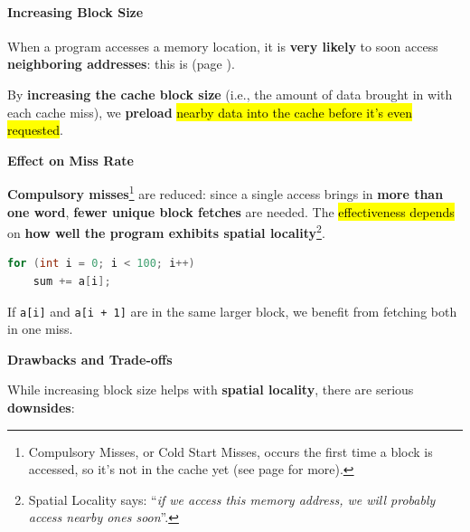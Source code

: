 \paragraph{Increasing Block Size}\label{paragraph: Increasing Block Size}

When a program accesses a memory location, it is \textbf{very likely} to soon access \textbf{neighboring addresses}: this is  (page \pageref{def: Spatial Locality}).

\highspace
By \textbf{increasing the cache block size} (i.e., the amount of data brought in with each cache miss), we \textbf{preload} \hl{nearby data into the cache before it's even requested}.

\highspace
\begin{flushleft}
    \textcolor{Green3}{\faIcon{\speedIcon} \textbf{Effect on Miss Rate}}
\end{flushleft}
\textbf{Compulsory misses}\footnote{Compulsory Misses, or Cold Start Misses, occurs the first time a block is accessed, so it's not in the cache yet (see page \pageref{def: Compulsory Misses} for more).} are reduced: since a single access brings in \textbf{more than one word}, \textbf{fewer unique block fetches} are needed. The \hl{effectiveness depends} on \textbf{how well the program exhibits spatial locality}\footnote{Spatial Locality says: ``\emph{if we access this memory address, we will probably access nearby ones soon}''.}.

\highspace
\begin{examplebox}
    \begin{lstlisting}[language=c]
for (int i = 0; i < 100; i++)
    sum += a[i];\end{lstlisting}
    If \texttt{a[i]} and \texttt{a[i + 1]} are in the same larger block, we benefit from fetching both in one miss.
\end{examplebox}

\highspace
\begin{flushleft}
    \textcolor{Red2}{ \textbf{Drawbacks and Trade-offs}}
\end{flushleft}
While increasing block size helps with \textbf{spatial locality}, there are serious \textbf{downsides}:

